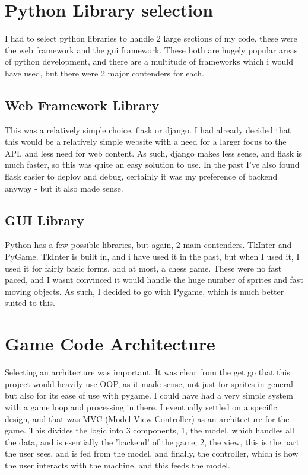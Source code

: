 \section{Python Library selection}
I had to select python libraries to handle 2 large sections of my code, these were the web framework and the gui framework. These both are hugely popular areas of python development, and there are a multitude of frameworks which i would have used, but there were 2 major contenders for each.

\subsection{Web Framework Library}
This was a relatively simple choice, flask or django. I had already decided that this would be a relatively simple website with a need for a larger focus to the API, and less need for web content. As such, django makes less sense, and flask is much faster, so this was quite an easy solution to use. In the past I've also found flask easier to deploy and debug, certainly it was my preference of backend anyway - but it also made sense.

\subsection{GUI Library}
Python has a few possible libraries, but again, 2 main contenders. TkInter and PyGame. TkInter is built in, and i have used it in the past, but when I used it, I used it for fairly basic forms, and at most, a chess game. These were no fast paced, and I wasnt convinced it would handle the huge number of sprites and fast moving objects. As such, I decided to go with Pygame, which is much better suited to this.

\section{Game Code Architecture}
Selecting an architecture was important. It was clear from the get go that this project would heavily use OOP, as it made sense, not just for sprites in general but also for its ease of use with pygame. I could have had a very simple system with a game loop and processing in there. I eventually settled on a specific design, and that was MVC (Model-View-Controller) as an architecture for the game.  This divides the logic into 3 components, 1, the model, which handles all the data, and is esentially the 'backend' of the game; 2, the view, this is the part the user sees, and is fed from the model, and finally, the controller, which is how the user interacts with the machine, and this feeds the model. 

